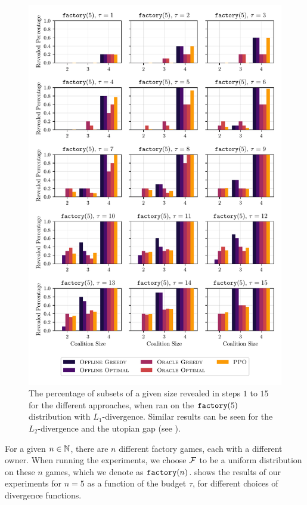 \begin{figure}[t!]
  \centering
	\includegraphics[width=\textwidth]{figures/exploitability_predictible_factory5_coalition_bar_sizes.pdf}
	\caption{ The percentage of subsets of a given size revealed in steps $1 $ to $ 15$ for the different approaches, when ran on the $\factory[5]$ distribution with $L_1$-divergence.
	Similar results can be seen for the $ L_2 $-divergence and the utopian gap (see ). }
	\label{fig:factory_coals}
\end{figure}

For a given $ n \in \N $, there are $ n $ different factory games, each with a different owner.
When running the experiments, we choose $ \fdist $ to be a uniform distribution on these $ n $ games, which we denote as $ \factory $.
 shows the results of our experiments for $ n=5 $ as a function of the budget $ \tau $, for different choices of divergence functions.

